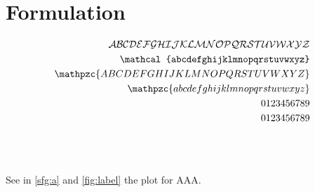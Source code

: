 \section{Formulation\label{sec:formulation}}
\begin{align}
\mathcal{ABCDEFGHIJKLMNOPQRSTUVWXYZ}\\
\mathcal{abcdefghijklmnopqrstuvwxyz}\\
\mathpzc{ABCDEFGHIJKLMNOPQRSTUVWXYZ}\\
\mathpzc{abcdefghijklmnopqrstuvwxyz}\\
0123456789\\
\text{0123456789}
\end{align}
\begin{figure}[!htb]
  \centering
  \\
  \\
\end{figure}

See in \cref{sfg:a} and \cref{fig:label} the plot for AAA.
